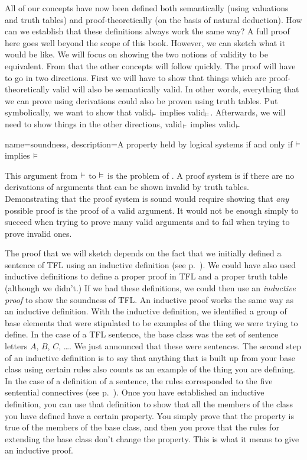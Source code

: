 All of our concepts have now been defined both semantically (using
valuations and truth tables) and proof-theoretically (on the basis of
natural deduction). How can we establish that these definitions always
work the same way? A full proof here goes well beyond the scope of
this book. However, we can sketch what it would be like. We will focus
on showing the two notions of validity to be equivalent.  From that
the other concepts will follow quickly. The proof will have to go in
two directions. First we will have to show that things which are
proof-theoretically valid will also be semantically valid. In other words,
everything that we can prove using derivations could also be proven
using truth tables. Put symbolically, we want to show that
valid$_{\vdash}$ implies valid$_{\vDash}$. Afterwards, we will need
to show things in the other directions,  valid$_{\vDash}$ implies
valid$_{\vdash}$

{
name=soundness,
description={A property held by logical systems if and only if $\vdash $ implies $\vDash $}
}

This argument from $\vdash $ to $\vDash $ is the problem of . \label{def:soundness} A proof system is  if there are no derivations of arguments that can be shown invalid by truth tables. \label{def_Soundness} Demonstrating that the proof system is sound would require showing that \emph{any} possible proof is the proof of a valid argument. It would not be enough simply to succeed when trying to prove many valid arguments and to fail when trying to prove invalid ones.

The proof that we will sketch depends on the fact that we initially
defined a sentence of TFL using an inductive definition (see
p.~\pageref{TFLsentences}). We could have also used inductive
definitions to define a proper proof in TFL and a proper truth table
(although we didn't.) If we had these definitions, we could then use an
\emph{inductive proof} to show the soundness of TFL. An inductive
proof works the same way as an inductive definition. With the
inductive definition, we identified a group of base elements that were
stipulated to be examples of the thing we were trying to define. In
the case of a TFL sentence, the base class was the set of sentence
letters $A$, $B$, $C$, \dots. We just announced that these were
sentences. The second step of an inductive definition is to say that
anything that is built up from your base class using certain rules
also counts as an example of the thing you are defining. In the case
of a definition of a sentence, the rules corresponded to the five
sentential connectives (see p.~\pageref{TFLsentences}). Once you have
established an inductive definition, you can use that definition to
show that all the members of the class you have defined have a certain
property. You simply prove that the property is true of the members of
the base class, and then you prove that the rules for extending the
base class don't change the property. This is what it means to give an
inductive proof.

